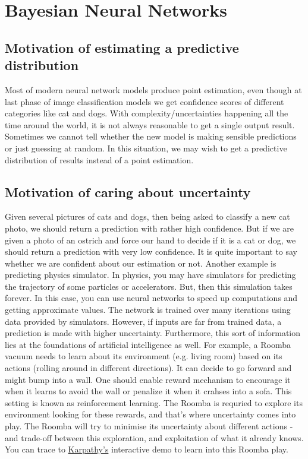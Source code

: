 \chapter{Bayesian Neural Networks}

\section{ Motivation of estimating a predictive distribution }

Most of modern neural network models produce point estimation, even though at last phase of image classification models we get confidence scores of different categories like cat and dogs. With complexity/uncertainties happening all the time around the world, it is not always reasonable to get a single output result. Sometimes we cannot tell whether the new model is making sensible predictions or just guessing at random. In this situation, we may wish to get a predictive distribution of results instead of a point estimation.\\

\section{Motivation of caring about uncertainty}

Given several pictures of cats and dogs, then being asked to classify a new cat photo, we should return a prediction with rather high confidence. But if we are given a photo of an ostrich and force our hand to decide if it is a cat or dog, we should return a prediction with very low confidence. It is quite important to say whether we are confident about our estimation or not. Another example is predicting physics simulator. In physics, you may have simulators for predicting the trajectory of some particles or accelerators. But, then this simulation takes forever. In this case, you can use neural networks to speed up computations and getting approximate values. The network is trained over many iterations using data provided by simulators. However, if inputs are far from trained data, a prediction is made with higher uncertainty. Furthermore, this sort of information lies at the foundations of artificial intelligence as well. For example, a Roomba vacuum needs to learn about its environment (e.g. living room) based on its actions (rolling around in different directions). It can decide to go forward and might bump into a wall. One should enable reward mechanism to encourage it when it learns to avoid the wall or penalize it when it crahses into a sofa. This setting is known as reinforcement learning. The Roomba is requried to explore its environment looking for these rewards, and that's where uncertainty comes into play. The Roomba will try to minimise its uncertainty about different actions - and trade-off between this exploration, and exploitation of what it already knows. You can trace to \href{https://cs.stanford.edu/people/karpathy/convnetjs/demo/rldemo.html}{Karpathy's} interactive demo to learn into this Roomba play.

